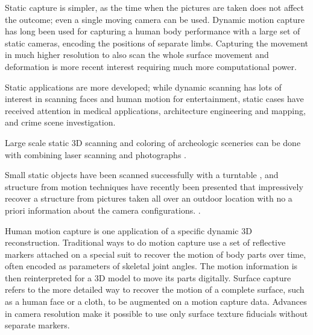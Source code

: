 Static capture is simpler, as the time when the pictures are taken does not affect the outcome; even a single moving camera can be used.
Dynamic motion capture has long been used for capturing a human body performance with a large set of static cameras, encoding the positions of separate limbs.
Capturing the movement in much higher resolution to also scan the whole surface movement and deformation is more recent interest requiring much more computational power.




Static applications are more developed;
while dynamic scanning has lots of interest in scanning faces and human motion for entertainment, static cases have received attention in medical applications, architecture engineering and mapping, and crime scene investigation.

Large scale static 3D scanning and coloring of archeologic sceneries can be done with combining laser scanning and photographs \cite{lerma2010terrestrial}.

Small static objects have been scanned successfully with a turntable \cite{fitzgibbon1998automatic}, and structure from motion techniques have recently been presented that impressively recover a structure from pictures taken all over an outdoor location with no a priori information about the camera configurations. \cite{goesele2007multi,furukawa2010towards}.


Human motion capture is one application of a specific dynamic 3D reconstruction.
Traditional ways to do motion capture use a set of reflective markers attached on a special suit to recover the motion of body parts over time, often encoded as parameters of skeletal joint angles.
The motion information is then reinterpreted for a 3D model to move its parts digitally.
Surface capture refers to the more detailed way to recover the motion of a complete surface, such as a human face or a cloth, to be augmented on a motion capture data.
Advances in camera resolution make it possible to use only surface texture fiducials without separate markers.

